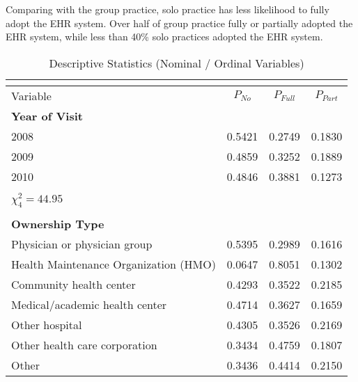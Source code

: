 \documentclass[12pt]{report}
\begin{document}
Comparing with the group practice, solo practice has less likelihood to fully adopt the EHR system. Over half of group practice fully or partially adopted the EHR system, while less than 40\% solo practices adopted the EHR system. 
{\footnotesize 
\begin{center}



\begin{longtable}{lccc}
\caption{Descriptive Statistics (Nominal / Ordinal Variables)}\\
\label{tab:desc1}\\

\hline \hline Variable & $P_{No}$ & $P_{Full}$ & $P_{Part}$ \\ \hline \endhead

\hline \endfoot
\hline \hline \endlastfoot
\textbf{Year of Visit}                 &          &            &            \\
2008                                   & 0.5421   & 0.2749     & 0.1830     \\
2009                                   & 0.4859   & 0.3252     & 0.1889     \\
2010                                   & 0.4846   & 0.3881     & 0.1273     \\
                                       &          &            &            \\
$\chi^2_4 = 44.95$                     &          &            &            \\
                                       &          &            &            \\
\textbf{Ownership Type}                &          &            &            \\
Physician or physician group           & 0.5395   & 0.2989     & 0.1616     \\
Health Maintenance Organization (HMO)  & 0.0647   & 0.8051     & 0.1302     \\
Community health center                & 0.4293   & 0.3522     & 0.2185     \\
Medical/academic health center         & 0.4714   & 0.3627     & 0.1659     \\
Other hospital                         & 0.4305   & 0.3526     & 0.2169     \\
Other health care corporation          & 0.3434   & 0.4759     & 0.1807     \\
Other                                  & 0.3436   & 0.4414     & 0.2150     \\

\end{longtable}
\end{center}}
\end{document}
